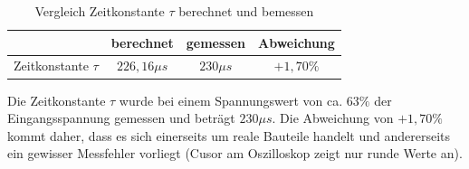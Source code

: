 \documentclass[12pt,a4paper,titlepage]{article}
\begin{document}
\begin{table}[H]
  \centering
  \begin{tabular}{|c|c|c|c|}
  \hline
                     & berechnet    & gemessen    & Abweichung \\ \hline
  Zeitkonstante $\tau$ & $226,16 \mu s$    & $230 \mu s$      & $+1,70 \%$ \\ \hline
  \end{tabular}
  \caption{Vergleich Zeitkonstante $\tau$ berechnet und bemessen}
  \label{Figure03}
\end{table}
\noindent Die Zeitkonstante $\tau$ wurde bei einem Spannungswert von ca. $63 \%$ der Eingangsspannung gemessen und betr\"agt $230 \mu s$. Die Abweichung von $+1,70 \%$ kommt daher, dass es sich einerseits um reale Bauteile handelt und andererseits ein gewisser Messfehler vorliegt (Cusor am Oszilloskop zeigt nur runde Werte an).
\end{document}
